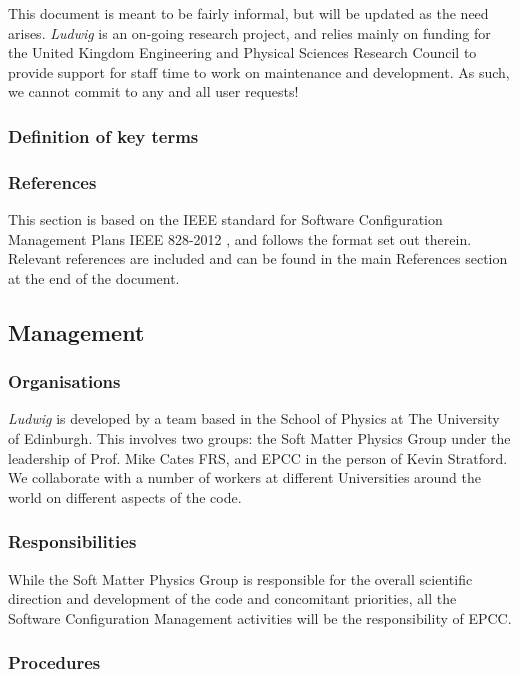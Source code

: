 \documentclass[11pt,twoside]{article}
\begin{document}
This document is meant to be fairly informal, but will be updated as
the need arises. 
\textit{Ludwig} is an on-going research project, and relies mainly
on funding for the United Kingdom Engineering and Physical Sciences Research
Council to provide support for staff time to work on maintenance and
development. As such, we cannot commit to any and all user requests!

\subsubsection{Definition of key terms}

\subsubsection{References}

This section is based on the IEEE standard for Software Configuration
Management Plans IEEE 828-2012 \cite{ieee-828-2012}, and follows the format
set out therein.
Relevant references are included and can be found in the main References
section at the end of the document.

\subsection{Management}

\subsubsection{Organisations}

\textit{Ludwig} is developed by a team based in the School of Physics at
The University of Edinburgh. This involves two groups: the Soft Matter
Physics Group  under the leadership of Prof. Mike Cates FRS, and EPCC in
the person of Kevin Stratford. We collaborate with a number of workers at
different Universities around the world on different aspects of the code.

\subsubsection{Responsibilities}

While the Soft Matter Physics Group is responsible for the overall
scientific direction and development of the code and concomitant
priorities, all the Software Configuration Management activities will
be the responsibility of EPCC.

\subsubsection{Procedures}
\end{document}
